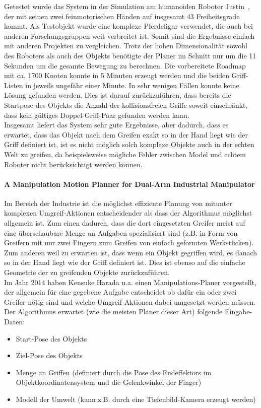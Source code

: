 Getestet wurde das System in der Simulation am humanoiden Roboter Justin~\citep{ott2006humanoid}, der mit seinen zwei feinmotorischen Händen auf insgesamt 43 Freiheitsgrade kommt. Als Testobjekt wurde eine komplexe Pferdefigur verwendet, die auch bei anderen Forschungsgruppen weit verbreitet ist. Somit sind die Ergebnisse einfach mit anderen Projekten zu vergleichen. Trotz der hohen Dimensionalität sowohl des Roboters als auch des Objekts benötigte der Planer im Schnitt nur um die 11 Sekunden um die gesamte Bewegung zu berechnen. Die vorbereitete Roadmap mit ca. 1700 Knoten konnte in 5 Minuten erzeugt werden und die beiden Griff-Listen in jeweils ungefähr einer Minute. In sehr wenigen Fällen konnte keine Lösung gefunden werden. Dies ist darauf zurückzuführen, dass bereits die Startpose des Objekts die Anzahl der kollisionsfreien Griffe soweit einschränkt, dass kein gültiges Doppel-Griff-Paar gefunden werden kann.\\
Insgesamt liefert das System sehr gute Ergebnisse, aber dadurch, dass es erwartet, dass das Objekt nach dem Greifen exakt so in der Hand liegt wie der Griff definiert ist, ist es nicht möglich solch komplexe Objekte auch in der echten Welt zu greifen, da beispielsweise mögliche Fehler zwischen Model und echtem Roboter nicht berücksichtigt werden können.


\paragraph{A Manipulation Motion Planner for Dual-Arm Industrial Manipulator}

Im Bereich der Industrie ist die möglichst effiziente Planung von mitunter komplexen Umgreif-Aktionen entscheidender als dass der Algorithmus möglichst allgemein ist. Zum einen dadurch, dass die dort eingesetzten Greifer meist auf eine überschaubare Menge an Aufgaben spezialisiert sind (z.B. in Form von Greifern mit nur zwei Fingern zum Greifen von einfach geformten Werkstücken). Zum anderen weil zu erwarten ist, dass wenn ein Objekt gegriffen wird, es danach so in der Hand liegt wie der Griff definiert ist. Dies ist ebenso auf die einfache Geometrie der zu greifenden Objekte zurückzuführen.\\

Im Jahr 2014 haben Kensuke Harada u.a. einen Manipulations-Planer vorgestellt, der allgemein für eine gegebene Aufgabe entscheidet ob dafür ein oder zwei Greifer nötig sind und welche Umgreif-Aktionen dabei umgesetzt werden müssen.\\
Der Algorithmus erwartet (wie die meisten Planer dieser Art) folgende Eingabe-Daten:
\begin{itemize}
\item Start-Pose des Objekts
\item Ziel-Pose des Objekts
\item Menge an Griffen (definiert durch die Pose des Endeffektors im Objektkoordinatensystem und die Gelenkwinkel der Finger)
\item Modell der Umwelt (kann z.B. durch eine Tiefenbild-Kamera erzeugt werden)
\end{itemize} 

